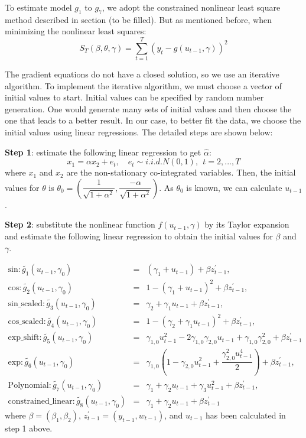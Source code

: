 \documentclass[a4paper,12pt,times,numbered,print,index]{report}
\numberwithin{equation}{section}
\begin{document}
	To estimate model $g_1$ to $g_7$, we adopt the constrained nonlinear least square method described in section (to be filled). But as mentioned before, when minimizing the nonlinear least squares:
	$$
	S_{T}(\beta, \theta, \gamma)=\sum_{t=1}^{T}\left(y_{t}-g\left(u_{t-1}, \gamma\right)\right)^{2}
	$$
	
	The gradient equations do not have a closed solution, so we use an iterative algorithm. To implement the iterative algorithm, we must choose a vector of initial values to start. Initial values can be specified by random number generation. One would generate many sets of initial values and then choose the one that leads to a better result. In our case, to better fit the data, we choose the initial values using linear regressions. The detailed steps are shown below:
	
	\textbf{Step 1}: estimate the following linear regression to get $\hat{\alpha}$:
	$$
	x_1 = \alpha x_2 + e_t, \quad e_{t}\sim i.i.d.N\left( 0,1\right) ,\ \ t=2,...,T
	$$
	where $x_1$ and $x_2$ are the non-stationary co-integrated variables. 
	Then, the initial values for $\theta$ is $\theta_{0} = (\dfrac{1}{\sqrt{1+\alpha^2}}, \dfrac{-\alpha}{\sqrt{1+\alpha^2}})$. 
	As $\theta_{0}$ is known, we can calculate $u_{t-1}$.
	
	\textbf{Step 2}: substitute the nonlinear function $f\left( u_{t-1},\gamma \right)$ by its Taylor expansion and estimate the following linear regression to obtain the initial values for $\beta$ and $\gamma$.
	
	\begin{eqnarray*}
		\text{sin}: \tilde{g_{1}}\left( u_{t-1},\gamma _{0}\right) &=& \left( \gamma_{1} + u_{t-1}\right) + \beta z_{t-1}^{\prime},  \\
		\text{cos}: \tilde{g_{2}}\left( u_{t-1},\gamma _{0}\right) &=& 1 - \left( \gamma_{1} + u_{t-1}\right)^2  + \beta z_{t-1}^{\prime}, \\
		\text{sin\_scaled}: \tilde{g_{3}}\left( u_{t-1},\gamma_{0}\right) &=& \gamma_{2}  + \gamma_{1}u_{t-1} + \beta z_{t-1}^{\prime},  \\
		\text{cos\_scaled}: \tilde{g_{4}}\left( u_{t-1},\gamma_{0}\right) &=& 1 - \left( \gamma_{2} + \gamma_{1}u_{t-1}\right)^2  + \beta z_{t-1}^{\prime}, \\
		\text{exp\_shift}: \tilde{g_{5}}\left( u_{t-1}, \gamma_{0}\right) &=&  \gamma_{1,0}u_{t-1}^2 - 2\gamma_{1,0}\gamma_{2,0}u_{t-1} + \gamma_{1,0}\gamma_{2,0}^2 + \beta z_{t-1}^{\prime} \\
		\text{exp}: \tilde{g_{6}}\left( u_{t-1},\gamma _{0}\right) &=&  \gamma_{1,0}(1-\gamma_{2,0}u_{t-1}^2 + \dfrac{\gamma_{2,0}^2 u_{t-1}^4}{2}) + \beta z_{t-1}^{\prime}, \\
		\text{Polynomial}: \tilde{g_{7}}\left( u_{t-1},\gamma_{0}\right) &=& \gamma_{1}+ \gamma_{2}u_{t-1}+\gamma_{3}u_{t-1}^{2}+\beta z_{t-1}^{\prime}, \\
		\text{constrained\_linear}: \tilde{g_{8}}\left( u_{t-1},\gamma_{0}\right) &=& \gamma_{1}+ \gamma_{2}u_{t-1}+\beta z_{t-1}^{\prime}
	\end{eqnarray*}%
	where $\beta = (\beta_{1}, \beta_{2})$, $ z_{t-1}^{\prime } = (y_{t-1}, w_{t-1})$, and $u_{t-1}$ has been calculated in step 1 above.
	
\end{document}
